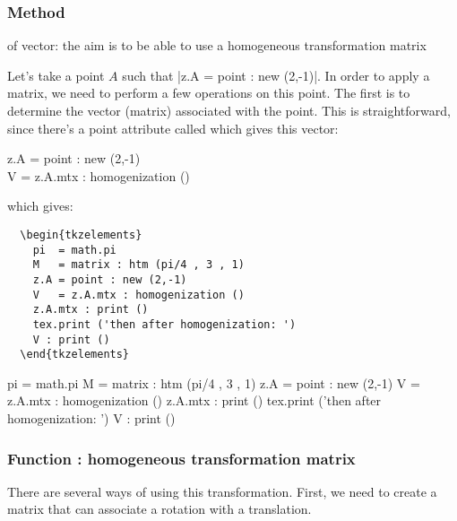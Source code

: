 \subsubsection{Method } %
\label{ssub:method_homogenization}

 of vector: the aim is to be able to use a homogeneous transformation matrix

Let's take a point $A$ such that |z.A = point : new (2,-1)|. In order to apply a   matrix, we need to perform a few operations on this point. The first is to determine the vector (matrix) associated with the point. This is straightforward, since there's a point attribute called  which gives this vector:

\begin{mybox}
z.A = point : new (2,-1)\\
V = z.A.mtx : homogenization ()
\end{mybox}
which gives:

\begin{minipage}{.5\textwidth}
  \begin{Verbatim}
  \begin{tkzelements}
    pi  = math.pi
    M   = matrix : htm (pi/4 , 3 , 1)
    z.A = point : new (2,-1)
    V   = z.A.mtx : homogenization ()
    z.A.mtx : print () 
    tex.print ('then after homogenization: ')
    V : print ()
  \end{tkzelements}
  \end{Verbatim}
\end{minipage}
\begin{minipage}{.5\textwidth}
\begin{tkzelements}
  pi  = math.pi
  M   = matrix : htm (pi/4 , 3 , 1)
  z.A = point : new (2,-1)
  V   = z.A.mtx : homogenization ()
  z.A.mtx : print () 
  tex.print ('then after homogenization: ')
  V : print ()
\end{tkzelements}
\end{minipage}


\subsubsection{Function : homogeneous transformation matrix} %
\label{ssub:method_htm}

There are several ways of using this transformation. First, we need to create a matrix that can associate a rotation with a translation.

